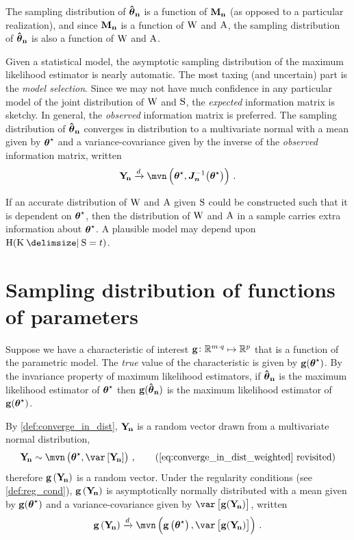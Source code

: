 \documentclass[
    11pt,
    extrafontsizes,
    article,
    oldfontcommands,
    final,
    oneside,
    openany,
    hidelinks]{memoir}
\begin{document}
The sampling distribution of $\boldsymbol{\mathbf{\hat{\boldsymbol{\mathbf{\theta}}}_{n}}}$ is a function of $\boldsymbol{\mathbf{M_n}}$ (as opposed to a particular realization), and since $\boldsymbol{\mathbf{M_n}}$ is a function of $\mathrm{W}$ and $\mathrm{A}$, the sampling distribution of $\boldsymbol{\mathbf{\hat{\boldsymbol{\mathbf{\theta}}}_{n}}}$ is also a function of $\mathrm{W}$ and $\mathrm{A}$.

Given a statistical model, the asymptotic sampling distribution of the maximum likelihood estimator is nearly automatic. The most taxing (and uncertain) part is the \emph{model selection}. Since we may not have much confidence in any particular model of the joint distribution of $\mathrm{W}$ and $\mathrm{S}$, the \emph{expected} information matrix is sketchy. In general, the \emph{observed} information matrix is preferred. The sampling distribution of $\boldsymbol{\mathbf{\hat{\boldsymbol{\mathbf{\theta}}}_{n}}}$ converges in distribution to a multivariate normal with a mean given by ${\boldsymbol{\mathbf{\theta}}}^{\star}$ and a variance-covariance given by the inverse of the \emph{observed} information matrix, written
\begin{equation}
    \sampdu \xrightarrow{d} \mvn\left(\tparam\sysparamvec, \matrx{J}_{\matrx{n}}^{-1}\!\left(\tparam\sysparamvec\right)\right)\,.
\end{equation}

If an accurate distribution of $\mathrm{W}$ and $\mathrm{A}$ given $\mathrm{S}$ could be constructed such that it is dependent on ${\boldsymbol{\mathbf{\theta}}}^{\star}$, then the distribution of $\mathrm{W}$ and $\mathrm{A}$ in a sample carries extra information about ${\boldsymbol{\mathbf{\theta}}}^{\star}$.
A plausible model may depend upon $\entropy(\RV{K} \Given \sv = t)$.

\chapter{Sampling distribution of functions of parameters}
\label{sec:app}
Suppose we have a characteristic of interest $\boldsymbol{\mathbf{\operatorname{g}}} \colon \mathbb{R}^{m \cdot q} \mapsto \mathbb{R}^{p}$ that is a function of the parametric model.
The \emph{true} value of the characteristic is given by $\boldsymbol{\mathbf{\operatorname{g}}}({\boldsymbol{\mathbf{\theta}}}^{\star})$.
By the invariance property of maximum likelihood estimators, if $\boldsymbol{\mathbf{\hat{\boldsymbol{\mathbf{\theta}}}_{n}}}$ is the maximum likelihood estimator of ${\boldsymbol{\mathbf{\theta}}}^{\star}$ then $\boldsymbol{\mathbf{\operatorname{g}}}(\boldsymbol{\mathbf{\hat{\boldsymbol{\mathbf{\theta}}}_{n}}})$ is the maximum likelihood estimator of $\boldsymbol{\mathbf{\operatorname{g}}}({\boldsymbol{\mathbf{\theta}}}^{\star})$.

By \cref{def:converge_in_dist}, $\mathrm{\boldsymbol{\mathbf{Y_{\!n}}}}$ is a random vector drawn from a multivariate normal distribution,
\begin{equation*}
\sampdu \sim \mvn\left(\tparam\sysparamvec, \var\left[\sampdu\right]\right)\,,
\tag{\text{\ref{eq:converge_in_dist_weighted} revisited}}
\end{equation*}
therefore $\boldsymbol{\mathbf{\operatorname{g}}}\left(\mathrm{\boldsymbol{\mathbf{Y_{\!n}}}}\right)$ is a random vector. Under the regularity conditions (see \cref{def:reg_cond}), $\boldsymbol{\mathbf{\operatorname{g}}}\left(\mathrm{\boldsymbol{\mathbf{Y_{\!n}}}}\right)$ is asymptotically normally distributed with a mean given by $\boldsymbol{\mathbf{\operatorname{g}}}({\boldsymbol{\mathbf{\theta}}}^{\star})$ and a variance-covariance given by $\var\left[\vecstat(\sampdu)\right]$, written
\begin{equation}
\vecstat\left(\sampdu\right) \xrightarrow{d} \mvn\left(\vecstat\left(\tparam\sysparamvec\right), \var\left[\vecstat(\sampdu)\right]\right)\,.
\end{equation}
\end{document}
